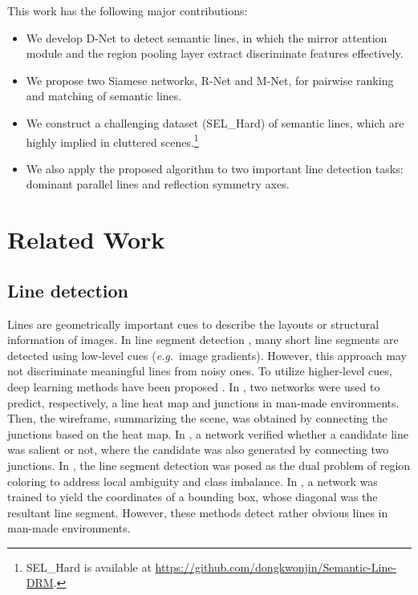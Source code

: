 \documentclass[runningheads]{llncs}
\newcommand{\eg}{\textit{e.g.}}
\begin{document}
This work has the following major contributions:

\begin{itemize}
\item We develop D-Net to detect semantic lines, in which the mirror attention module and the region pooling layer extract discriminate features effectively.
\item We propose two Siamese networks, R-Net and M-Net, for pairwise ranking and matching of semantic lines.
\item We construct a challenging dataset (SEL\_Hard) of semantic lines, which are highly implied in cluttered scenes.\footnote{SEL\_Hard is available at \href{https://github.com/dongkwonjin/Semantic-Line-DRM}{https://github.com/dongkwonjin/Semantic-Line-DRM}.}
\item We also apply the proposed algorithm to two important line detection tasks: dominant parallel lines and reflection symmetry axes.
\end{itemize}

\section{Related Work}

\subsection{Line detection}
Lines are geometrically important cues to describe the layouts or structural information of images. In line segment detection \cite{matas2000,von2008,desolneux200,akinlar2011}, many short line segments are detected using low-level cues (\eg~image gradients). However, this approach  may not discriminate meaningful lines from noisy ones. To utilize higher-level cues, deep learning methods have been proposed \cite{huang2018,xue2019,zhou2019_line,sun2019}.
In \cite{huang2018}, two networks were used to predict, respectively, a line heat map and junctions in man-made environments. Then, the wireframe, summarizing the scene, was obtained by connecting the junctions based on the heat map. In \cite{zhou2019_line}, a network verified whether a candidate line was salient or not, where the candidate was also generated by connecting two junctions. In \cite{xue2019}, the line segment detection was posed as the dual problem of region coloring to address local ambiguity and class imbalance. In \cite{sun2019}, a network was trained to yield the coordinates of a bounding box, whose diagonal was the resultant line segment. However, these methods \cite{huang2018,xue2019,zhou2019_line,sun2019} detect rather obvious lines in man-made environments.
\end{document}
